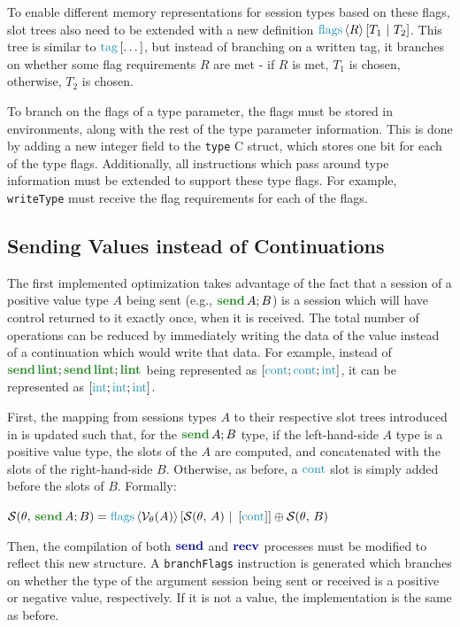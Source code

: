 To enable different memory representations for session types based on these flags, slot trees also need to be extended with a new definition $\flagsst{R}{T_1}{T_2}$. This tree is similar to $\tagst{\dots}$, but instead of branching on a written tag, it branches on whether some flag requirements $R$ are met - if $R$ is met, $T_1$ is chosen, otherwise, $T_2$ is chosen.

To branch on the flags of a type parameter, the flags must be stored in environments, along with the rest of the type parameter information. This is done by adding a new integer field to the \texttt{type} C struct, which stores one bit for each of the type flags. Additionally, all instructions which pass around type information must be extended to support these type flags. For example, \texttt{writeType} must receive the flag requirements for each of the flags.

\subsection{Sending Values instead of Continuations} \label{subsection:SendValueOptimizations}

The first implemented optimization takes advantage of the fact that a session of a positive value type $A$ being sent (e.g., $\sendt{A}{B}$) is a session which will have control returned to it exactly once, when it is received. The total number of operations can be reduced by immediately writing the data of the value instead of a continuation which would write that data. For example, instead of $\sendt{\lintt}{\sendt{\lintt}{\lintt}}$ being represented as $\seqst{\conts;\conts;\ints}$, it can be represented as $\seqst{\ints;\ints;\ints}$.

First, the mapping from sessions types $A$ to their respective slot trees introduced in  is updated such that, for the $\sendt{A}{B}$ type, if the left-hand-side $A$ type is a positive value type, the slots of the $A$ are computed, and concatenated with the slots of the right-hand-side $B$. Otherwise, as before, a $\conts$ slot is simply added before the slots of $B$. Formally:\vspace{2pt}\\
\vspace{2pt}\centerline{$
    \slots{\theta}{\sendt{A}{B}} = \concatst{\flagsst{\isvalue{A}}{\slots{\theta}{A}}{\seqst{\conts}}}{\slots{\theta}{B}}
$}

Then, the compilation of both $\sendp$ and $\recvp$ processes must be modified to reflect this new structure. A \texttt{branchFlags} instruction is generated which branches on whether the type of the argument session being sent or received is a positive or negative value, respectively. If it is not a value, the implementation is the same as before.

